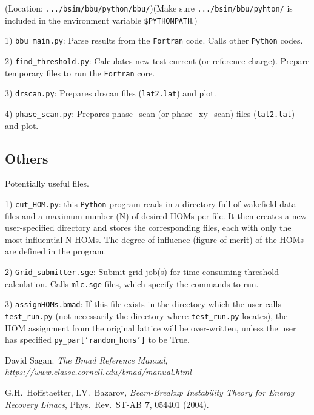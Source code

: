 \documentclass{hitec}
\begin{document}
(Location: \texttt{.../bsim/bbu/python/bbu/})(Make sure \texttt{.../bsim/bbu/pyhton/} is included in the environment variable \texttt{\$PYTHONPATH}.)

1) \texttt{bbu_main.py}: Parse results from the \texttt{Fortran} code. Calls other \texttt{Python} codes.

2) \texttt{find_threshold.py}: Calculates new test current (or reference charge). Prepare temporary files to run the \texttt{Fortran} core.

3) \texttt{drscan.py}: Prepares drscan files (\texttt{lat2.lat}) and plot.

4) \texttt{phase_scan.py}: Prepares phase_scan (or phase_xy_scan) files (\texttt{lat2.lat}) and plot.

\subsection{Others}
Potentially useful files.

1) \texttt{cut_HOM.py}: this \texttt{Python} program reads in a directory full of wakefield data files and a maximum number (N) of desired HOMs per file. It then creates a new user-specified directory and stores the corresponding files, each with only the most influential N HOMs. The degree of influence (figure of merit) of the HOMs are defined in the program.

2) \texttt{Grid_submitter.sge}: Submit grid job(s) for time-consuming threshold calculation. Calls \texttt{mlc.sge} files, which specify the commands to run.

3) \texttt{assignHOMs.bmad}: If this file exists in the directory which the user calls \texttt{test_run.py}  (not necessarily the directory where \texttt{test_run.py} locates), the HOM assignment from the original lattice will be over-written, unless the user has specified \texttt{py_par[`random_homs']} to be True.

\begin{thebibliography}{99}

David Sagan. {\em The Bmad Reference Manual},\\
{\em https://www.classe.cornell.edu/bmad/manual.html}

G.H.~Hoffstaetter, I.V.~Bazarov, \emph{Beam-Breakup Instability Theory for Energy Recovery Linacs},
Phys.~Rev.~ST-AB {\bf 7}, 054401 (2004).

\end{thebibliography}
\end{document}
